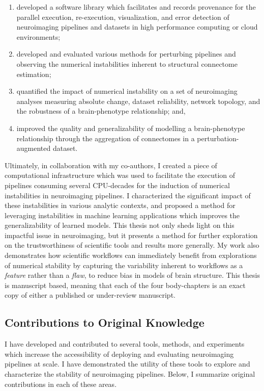 \begin{enumerate}[label=(\roman*)]
\item developed a software library which facilitates and records provenance for the parallel execution,
re-execution, visualization, and error detection of neuroimaging pipelines and datasets in high performance computing or cloud environments;
\item developed and evaluated various methods for perturbing pipelines and observing the numerical instabilities
inherent to structural connectome estimation;
\item quantified the impact of numerical instability on a set of neuroimaging analyses measuring absolute change,
dataset reliability, network topology, and the robustness of a brain-phenotype relationship; and,
\item improved the quality and generalizability of modelling a brain-phenotype relationship through the aggregation of
connectomes in a perturbation-augmented dataset.
\end{enumerate}

Ultimately, in collaboration with my co-authors, I created a piece of computational infrastructure which was used to
facilitate the execution of pipelines consuming several CPU-decades for the induction of numerical instabilities in
neuroimaging pipelines. I characterized the significant impact of these instabilities in various analytic contexts, and
proposed a method for leveraging instabilities in machine learning applications which improves the generalizability of
learned models. This thesis not only sheds light on this impactful issue in neuroimaging, but it presents a method for
further exploration on the trustworthiness of scientific tools and results more generally. My work also demonstrates
how scientific workflows can immediately benefit from explorations of numerical stability by capturing the variability
inherent to workflows as a \textit{feature} rather than a \textit{flaw}, to reduce bias in models of brain structure.
This thesis is manuscript based, meaning that each of the four body-chapters is an exact copy of either a published or
under-review manuscript.

\subsection{Contributions to Original Knowledge}
I have developed and contributed to several tools, methods, and experiments which increase the accessibility of
deploying and evaluating neuroimaging pipelines at scale. I have demonstrated the utility of these tools to explore and
characterize the stability of neuroimaging pipelines. Below, I summarize original contributions in each of these areas.

